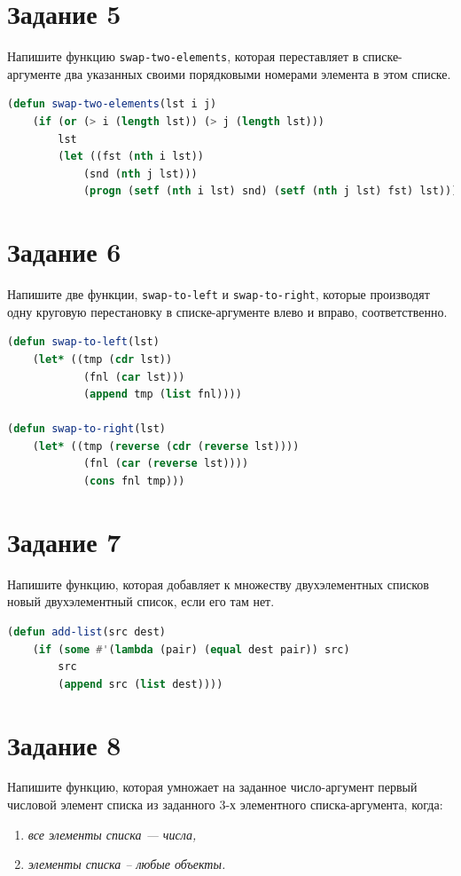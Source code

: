 \documentclass[12pt]{report}
\begin{document}
\section*{Задание 5}
Напишите функцию \texttt{swap-two-elements}, которая переставляет в списке-аргументе два указанных своими порядковыми номерами элемента в этом списке.

\begin{lstlisting}[language=Lisp]
(defun swap-two-elements(lst i j) 
	(if (or (> i (length lst)) (> j (length lst)))
		lst
		(let ((fst (nth i lst))
			(snd (nth j lst)))
			(progn (setf (nth i lst) snd) (setf (nth j lst) fst) lst))))
\end{lstlisting}


\section*{Задание 6}
Напишите две функции, \texttt{swap-to-left} и \texttt{swap-to-right}, которые производят одну круговую перестановку в списке-аргументе влево и вправо, соответственно.
    
\begin{lstlisting}[language=Lisp]
(defun swap-to-left(lst)
	(let* ((tmp (cdr lst))
			(fnl (car lst)))
			(append tmp (list fnl))))
		
(defun swap-to-right(lst)
	(let* ((tmp (reverse (cdr (reverse lst))))
			(fnl (car (reverse lst))))
			(cons fnl tmp)))
\end{lstlisting}






\section*{Задание 7}
Напишите функцию, которая добавляет к множеству двухэлементных списков новый двухэлементный список, если его там нет.

\begin{lstlisting}[language=Lisp]
(defun add-list(src dest)
	(if (some #'(lambda (pair) (equal dest pair)) src)
		src
		(append src (list dest))))		
\end{lstlisting}



\section*{Задание 8}
Напишите функцию, которая умножает на заданное число-аргумент первый числовой элемент списка из заданного 3-х элементного списка-аргумента, когда:		
\begin{enumerate}
	\item \textit{все элементы списка --- числа,}
	\item \textit{элементы списка -- любые объекты.}
\end{enumerate}
\end{document}
